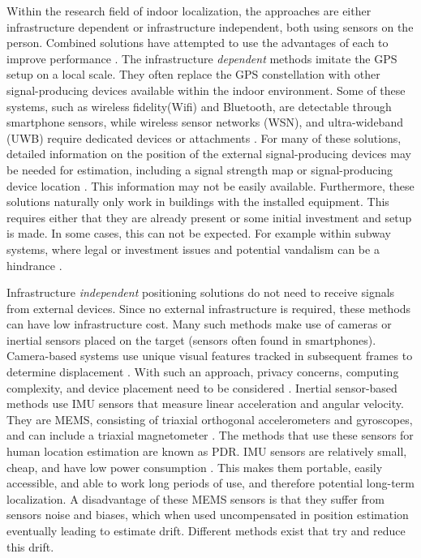 Within the research field of indoor localization, the approaches are either infrastructure dependent or infrastructure independent, both using sensors on the person. Combined solutions have attempted to use the advantages of each to improve performance \cite{Gu2019, Correa2017}. The infrastructure \textit{dependent} methods imitate the GPS setup on a local scale. They often replace the GPS constellation with other signal-producing devices available within the indoor environment. Some of these systems, such as wireless fidelity(Wifi) and Bluetooth, are detectable through smartphone sensors, while wireless sensor networks (WSN), and ultra-wideband (UWB) require dedicated devices or attachments \cite{Wu2019,Jackermeier2018,Davidson2017}. For many of these solutions, detailed information on the position of the external signal-producing devices may be needed for estimation, including a signal strength map or signal-producing device location \cite{Jackermeier2018,Shang2015}. This information may not be easily available. Furthermore, these solutions naturally only work in buildings with the installed equipment. This requires either that they are already present or some initial investment and setup is made. In some cases, this can not be expected. For example within subway systems, where legal or investment issues and potential vandalism can be a hindrance \cite{Torok2014}. \par
%

Infrastructure \textit{independent} positioning solutions do not need to receive signals from external devices. Since no external infrastructure is required, these methods can have low infrastructure cost. Many such methods make use of cameras or inertial sensors placed on the target (sensors often found in smartphones). Camera-based systems use unique visual features tracked in subsequent frames to determine displacement \cite{Gu2019}. With such an approach, privacy concerns, computing complexity, and device placement need to be considered \cite{Gu2019}. Inertial sensor-based methods use \ac{IMU} sensors that measure linear acceleration and angular velocity. They are \ac{MEMS},  consisting of triaxial orthogonal accelerometers and gyroscopes, and can include a triaxial magnetometer \cite{Yang2014}. The methods that use these sensors for human location estimation are known as \ac{PDR}. \ac{IMU} sensors are relatively small, cheap, and have low power consumption \cite{Olsson2016}. This makes them portable, easily accessible, and able to work long periods of use, and therefore potential long-term localization. A disadvantage of these \ac{MEMS} sensors is that they suffer from sensors noise and biases, which when used uncompensated in position estimation eventually leading to estimate drift. Different methods exist that try and reduce this drift. \par

